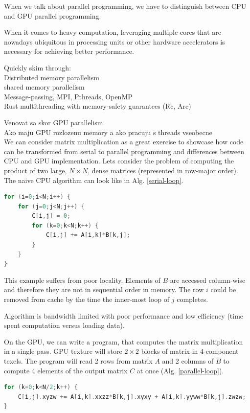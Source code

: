 When we talk about parallel programming, we have to distinguish between CPU and GPU parallel programming.

When it comes to heavy computation, leveraging multiple cores that are nowadays ubiquitous in processing units or other hardware accelerators is necessary for achieving better performance.

Quickly skim through: \\
Distributed memory parallelism \\
shared memory parallelism \\
Message-passing, MPI, Pthreads, OpenMP \\
Rust multithreading with memory-safety guarantees (Rc, Arc)

Venovat sa skor GPU parallelism \\
Ako maju GPU rozlozenu memory a ako pracuju s threads vseobecne\\

We can consider matrix multiplication as a great exercise to showcase how code can be transformed from serial to parallel programming and differences between CPU and GPU implementation. Lets consider the problem of computing the product of two large, $N \times N$, dense matrices (represented in row-major order). The naive CPU algorithm can look like in Alg. \ref{serial-loop}.

\begin{lstlisting}[language=Cpp, caption=Pseudocode with serial loop., label=serial-loop]
for (i=0;i<N;i++) {
	for (j=0;j<N;j++) {
		C[i,j] = 0;
		for (k=0;k<N;k++) {
			C[i,j] += A[i,k]*B[k,j];
		}
	}
}
\end{lstlisting}

This example suffers from poor locality. Elements of $B$ are accessed column-wise and therefore they are not in sequential order in memory. The row $i$ could be removed from cache by the time the inner-most loop of $j$ completes. 

Algorithm is bandwidth limited with poor performance and low efficiency (time spent computation versus loading data).

On the GPU, we can write a program, that computes the matrix multiplication in a single pass. GPU texture will store $2 \times 2$ blocks of matrix in 4-component texels. The program will read 2 rows from matrix $A$ and 2 columns of $B$ to compute 4 elements of the output matrix $C$ at once (Alg. \ref{parallel-loop}).

\begin{lstlisting}[language=Cpp, caption=Pseudocode with serial loop., label=parallel-loop]
for (k=0;k<N/2;k++) {
	C[i,j].xyzw += A[i,k].xxzz*B[k,j].xyxy + A[i,k].yyww*B[k,j].zwzw;
}
\end{lstlisting}




